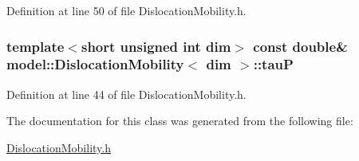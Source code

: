 Definition at line 50 of file Dislocation\+Mobility.\+h.

\hypertarget{classmodel_1_1_dislocation_mobility_ae6da53fc5cecff940de33c9d67ed20f1}{}
\subsubsection[{tau\+P}]{\setlength{\rightskip}{0pt plus 5cm}template$<$short unsigned int dim$>$ const double\& {\bf model\+::\+Dislocation\+Mobility}$<$ {\bf dim} $>$\+::tau\+P}\label{classmodel_1_1_dislocation_mobility_ae6da53fc5cecff940de33c9d67ed20f1}


Definition at line 44 of file Dislocation\+Mobility.\+h.



The documentation for this class was generated from the following file\+:\begin{DoxyCompactItemize}
\item 
\hyperlink{_dislocation_mobility_8h}{Dislocation\+Mobility.\+h}\end{DoxyCompactItemize}
